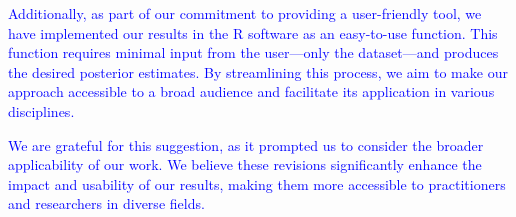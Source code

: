 \documentclass[12pt]{article}
\begin{document}
\textcolor{blue}{Additionally, as part of our commitment to providing a user-friendly tool, we have implemented our results in the R software as an easy-to-use function. This function requires minimal input from the user—only the dataset—and produces the desired posterior estimates. By streamlining this process, we aim to make our approach accessible to a broad audience and facilitate its application in various disciplines.}

\textcolor{blue}{We are grateful for this suggestion, as it prompted us to consider the broader applicability of our work. We believe these revisions significantly enhance the impact and usability of our results, making them more accessible to practitioners and researchers in diverse fields. }


%

%
\end{document}
